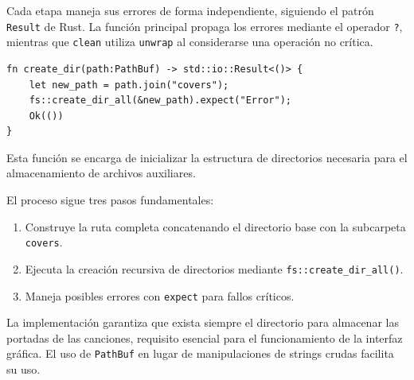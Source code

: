 \documentclass[11pt, a4paper]{article}
\begin{document}
            Cada etapa maneja sus errores de forma independiente, siguiendo el patrón \verb|Result| de Rust. La función principal propaga los errores mediante el operador \verb|?|, mientras que \verb|clean| utiliza \verb|unwrap| al considerarse una operación no crítica.

            \begin{lstlisting}[caption={fn create\_dir()}]
fn create_dir(path:PathBuf) -> std::io::Result<()> {
    let new_path = path.join("covers");
    fs::create_dir_all(&new_path).expect("Error");
    Ok(())
}
            \end{lstlisting}

            Esta función se encarga de inicializar la estructura de directorios necesaria para el almacenamiento de archivos auxiliares.

            El proceso sigue tres pasos fundamentales:

            \begin{enumerate}
              \item Construye la ruta completa concatenando el directorio base con la subcarpeta \verb|covers|.
              \item Ejecuta la creación recursiva de directorios mediante \verb|fs::create_dir_all()|.
              \item Maneja posibles errores con \verb|expect| para fallos críticos.
            \end{enumerate}

            La implementación garantiza que exista siempre el directorio para almacenar las portadas de las canciones, requisito esencial para el funcionamiento de la interfaz gráfica. El uso de \verb|PathBuf| en lugar de manipulaciones de strings crudas facilita su uso.
\end{document}
